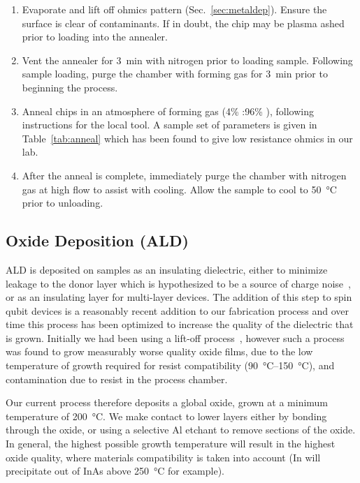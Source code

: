 \begin{enumerate}
    \item Evaporate and lift off ohmics pattern (Sec.~\ref{sec:metaldep}). Ensure the surface is clear of contaminants. If in doubt, the chip may be plasma ashed prior to loading into the annealer.
    \item Vent the annealer for \SI{3}{\minute} with nitrogen prior to loading sample. Following sample loading, purge the chamber with forming gas for \SI{3}{\minute} prior to beginning the process.
    \item Anneal chips in an atmosphere of forming gas (4\% :96\% ), following instructions for the local tool. A sample set of parameters is given in Table~\ref{tab:anneal} which has been found to give low resistance ohmics in our lab.
    \item After the anneal is complete, immediately purge the chamber with nitrogen gas at high flow to assist with cooling. Allow the sample to cool to \SI{50}{\celsius} prior to unloading.
\end{enumerate}

\subsection{Oxide Deposition (ALD)}
\label{sec:ald}
ALD is deposited on samples as an insulating dielectric, either to minimize leakage to the donor layer which
is hypothesized to be a source of charge noise~\cite{PhysRevB.72.115331}, or as an insulating layer for
multi-layer devices. The addition of this step to spin qubit devices is a reasonably recent addition to our
fabrication process and over time this process has been optimized to increase the quality of the dielectric
that is grown. Initially we had been using a lift-off process~\cite{doi:10.1063/1.1612904}, however such a process
was found to grow measurably worse quality oxide films, due to the low temperature of growth required for resist
compatibility (\SIrange{90}{150}{\celsius}), and contamination due to resist in the process chamber.

Our current process therefore deposits a global oxide, grown at a minimum temperature of \SI{200}{\celsius}.
We make contact to lower layers either by bonding through the oxide, or using a selective Al etchant to remove
sections of the oxide. In general, the highest possible growth temperature will result in the highest oxide
quality, where materials compatibility is taken into account (In will precipitate out of InAs above \SI{250}{\celsius} for example).

